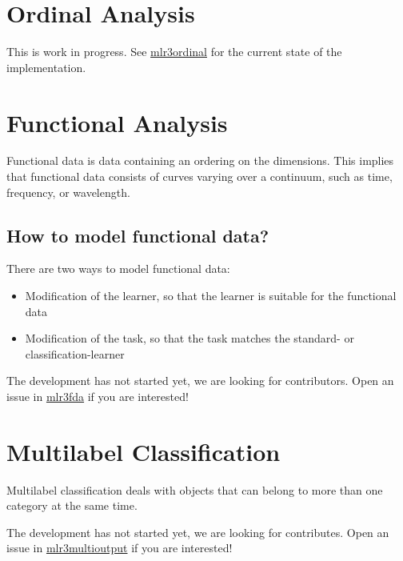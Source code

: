\documentclass[
]{scrbook}
\providecommand{\tightlist}{%
  \setlength{\itemsep}{0pt}\setlength{\parskip}{0pt}}
\begin{document}
\hypertarget{ordinal}{%
\section{Ordinal Analysis}\label{ordinal}}

This is work in progress.
See \href{https://github.com/mlr-org/mlr3ordinal}{mlr3ordinal} for the current state of the implementation.

\hypertarget{functional}{%
\section{Functional Analysis}\label{functional}}

Functional data is data containing an ordering on the dimensions.
This implies that functional data consists of curves varying over a continuum, such as time, frequency, or wavelength.

\hypertarget{how-to-model-functional-data}{%
\subsection{How to model functional data?}\label{how-to-model-functional-data}}

There are two ways to model functional data:

\begin{itemize}
\tightlist
\item
  Modification of the learner, so that the learner is suitable for the functional data
\item
  Modification of the task, so that the task matches the standard- or classification-learner
\end{itemize}

The development has not started yet, we are looking for contributors.
Open an issue in \href{https://github.com/mlr-org/mlr3fda}{mlr3fda} if you are interested!

\hypertarget{multilabel}{%
\section{Multilabel Classification}\label{multilabel}}

Multilabel classification deals with objects that can belong to more than one category at the same time.

The development has not started yet, we are looking for contributes.
Open an issue in \href{https://github.com/mlr-org/mlr3multioutput}{mlr3multioutput} if you are interested!
\end{document}

